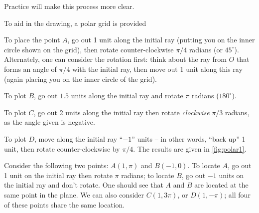 
Practice will make this process more clear.

{To aid in the drawing, a polar grid is provided
%
\parbox[t][0pt]{0pt}{%
\iflatexml
 }%
%
To place the point $A$, go out 1 unit along the initial ray (putting you on the inner circle shown on the grid), then rotate counter-clockwise $\pi/4$ radians (or $45^\circ$).  Alternately, one can consider the rotation first: think about the ray from $O$ that forms an angle of $\pi/4$ with the initial ray, then move out 1 unit along this ray (again placing you on the inner circle of the grid).

To plot $B$, go out $1.5$ units along the initial ray and rotate $\pi$ radians ($180^\circ$). 

To plot $C$, go out 2 units along the initial ray then rotate \textit{clockwise} $\pi/3$ radians, as the angle given is negative.

To plot $D$, move along the initial ray ``$-1$'' units -- in other words, ``back up'' 1 unit, then rotate counter-clockwise by $\pi/4$. The results are given in \autoref{fig:polar1}.}

Consider the following two points: $A(1,\pi)$ and $B(-1,0)$. To locate $A$, go out 1 unit on the initial ray then rotate $\pi$ radians; to locate $B$, go out $-1$ units on the initial ray and don't rotate. One should see that $A$ and $B$ are located at the same point in the plane. We can also consider $C(1,3\pi)$, or $D(1,-\pi)$; all four of these points share the same location. 

